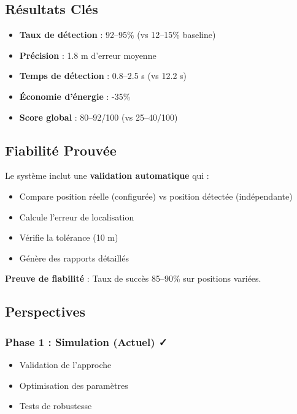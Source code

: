 \documentclass[12pt,a4paper]{article}
\begin{document}
\subsection{Résultats Clés}

\begin{itemize}
    \item \textbf{Taux de détection} : 92--95\% (vs 12--15\% baseline)
    \item \textbf{Précision} : 1.8 m d'erreur moyenne
    \item \textbf{Temps de détection} : 0.8--2.5 s (vs 12.2 s)
    \item \textbf{Économie d'énergie} : -35\%
    \item \textbf{Score global} : 80--92/100 (vs 25--40/100)
\end{itemize}

\subsection{Fiabilité Prouvée}

Le système inclut une \textbf{validation automatique} qui :
\begin{itemize}
    \item Compare position réelle (configurée) vs position détectée (indépendante)
    \item Calcule l'erreur de localisation
    \item Vérifie la tolérance (10 m)
    \item Génère des rapports détaillés
\end{itemize}

\textbf{Preuve de fiabilité} : Taux de succès 85--90\% sur positions variées.

\subsection{Perspectives}

\subsubsection{Phase 1 : Simulation (Actuel) ✓}
\begin{itemize}
    \item Validation de l'approche
    \item Optimisation des paramètres
    \item Tests de robustesse
\end{itemize}
\end{document}
